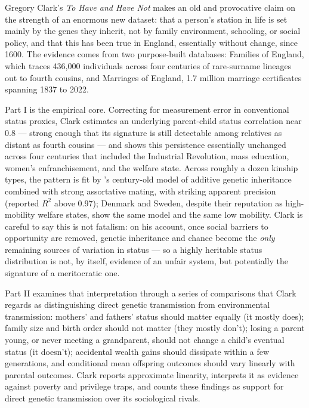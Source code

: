 \documentclass[12pt]{article}
\begin{document}
Gregory Clark's \emph{To Have and Have Not} \citep{Clark2026} makes an old
and provocative claim on the strength of an enormous new dataset: that a
person's station in life is set mainly by the genes they inherit, not by
family environment, schooling, or social policy, and that this has been true
in England, essentially without change, since 1600. The evidence comes from
two purpose-built databases: Families of England, which traces 436,000
individuals across four centuries of rare-surname lineages out to fourth
cousins, and Marriages of England, 1.7 million marriage certificates spanning
1837 to 2022.

Part I is the empirical core. Correcting for measurement error in
conventional status proxies, Clark estimates an underlying parent-child
status correlation near $0.8$ --- strong enough that its signature is still
detectable among relatives as distant as fourth cousins --- and shows this
persistence essentially unchanged across four centuries that included the
Industrial Revolution, mass education, women's enfranchisement, and the
welfare state. Across roughly a dozen kinship types, the pattern is fit by
\citet{Fisher1918}'s century-old model of additive genetic inheritance
combined with strong assortative mating, with striking apparent precision
(reported $R^2$ above $0.97$); Denmark and Sweden, despite their reputation
as high-mobility welfare states, show the same model and the same low
mobility. Clark is careful to say this is not fatalism: on his account, once social
barriers to opportunity are removed, genetic inheritance and chance become
the \emph{only} remaining sources of variation in status --- so a highly
heritable status distribution is not, by itself, evidence of an unfair
system, but potentially the signature of a meritocratic one.

Part II examines that interpretation through a series of comparisons
that Clark regards as distinguishing direct genetic transmission from
environmental transmission: mothers' and fathers'
status should matter equally (it mostly does); family size and birth order
should not matter (they mostly don't); losing a parent young, or never
meeting a grandparent, should not change a child's eventual status (it
doesn't); accidental wealth gains should dissipate within a few generations,
and conditional mean offspring outcomes should vary linearly with parental
outcomes. Clark reports approximate linearity, interprets it as evidence
against poverty and privilege traps, and counts these findings as support
for direct genetic transmission over its sociological rivals.
\end{document}
